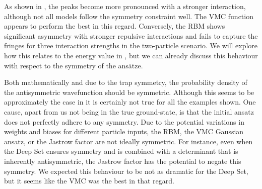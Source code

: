 As shown in , the peaks become more pronounced with a stronger interaction, although not all models follow the symmetry constraint well. The VMC function appears to perform the best in this regard. Conversely, the RBM shows significant asymmetry with stronger repulsive interactions and fails to capture the fringes for three interaction strengths in the two-particle scenario. We will explore how this relates to the energy value in , but we can already discuss this behaviour with respect to the symmetry of the ansätze.

Both mathematically and due to the trap symmetry, the probability density of the antisymmetric wavefunction should be symmetric. Although this seems to be approximately the case in  it is certainly not true for all the examples shown. One cause, apart from us not being in the true ground-state, is that the initial ansatz does not perfectly adhere to any symmetry. Due to the potential variations in weights and biases for different particle inputs, the RBM, the VMC Gaussian ansatz, or the Jastrow factor are not ideally symmetric. For instance, even when the Deep Set ensures symmetry and is combined with a determinant that is inherently antisymmetric, the Jastrow factor has the potential to negate this symmetry. We expected this behaviour to be not as dramatic for the Deep Set, but it seems like the VMC was the best in that regard.


